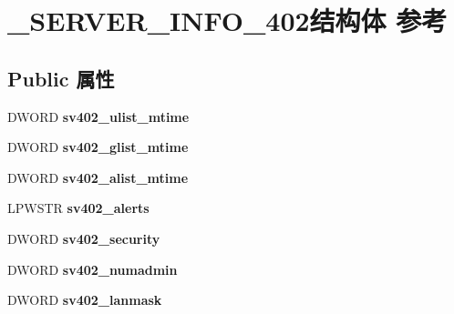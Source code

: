 \hypertarget{struct___s_e_r_v_e_r___i_n_f_o__402}{}\section{\+\_\+\+S\+E\+R\+V\+E\+R\+\_\+\+I\+N\+F\+O\+\_\+402结构体 参考}
\label{struct___s_e_r_v_e_r___i_n_f_o__402}
\subsection*{Public 属性}
\begin{DoxyCompactItemize}
\item 
\mbox{\label{struct___s_e_r_v_e_r___i_n_f_o__402_a9a939303c5e06554fd93c41e33ad529f}} 
D\+W\+O\+RD {\bfseries sv402\+\_\+ulist\+\_\+mtime}
\item 
\mbox{\label{struct___s_e_r_v_e_r___i_n_f_o__402_aafbdbad861e27eed6d228cc6240e81bc}} 
D\+W\+O\+RD {\bfseries sv402\+\_\+glist\+\_\+mtime}
\item 
\mbox{\label{struct___s_e_r_v_e_r___i_n_f_o__402_ae040ebb227d653deac7a0ced166c949e}} 
D\+W\+O\+RD {\bfseries sv402\+\_\+alist\+\_\+mtime}
\item 
\mbox{\label{struct___s_e_r_v_e_r___i_n_f_o__402_ab068c35096fe240f4f88a6dee51d1d4d}} 
L\+P\+W\+S\+TR {\bfseries sv402\+\_\+alerts}
\item 
\mbox{\label{struct___s_e_r_v_e_r___i_n_f_o__402_a112cf847fb896061eb9073cc5c47e182}} 
D\+W\+O\+RD {\bfseries sv402\+\_\+security}
\item 
\mbox{\label{struct___s_e_r_v_e_r___i_n_f_o__402_a79666ebeabfdeceaa29c1ca71c452577}} 
D\+W\+O\+RD {\bfseries sv402\+\_\+numadmin}
\item 
\mbox{\label{struct___s_e_r_v_e_r___i_n_f_o__402_a88991d4f5aa6210140845d90ae5e2a5e}} 
D\+W\+O\+RD {\bfseries sv402\+\_\+lanmask}
\item 
\mbox{\label{struct___s_e_r_v_e_r___i_n_f_o__402_abb88f2f6fd1906e3b6a309da98df17d2}} 

\end{DoxyCompactItemize}
